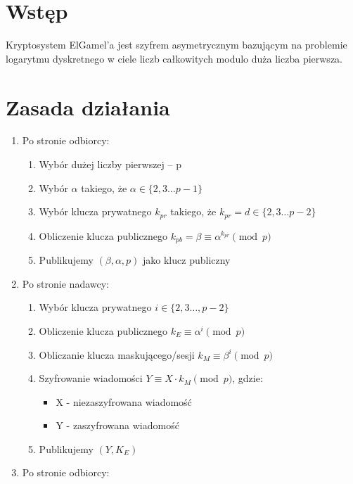 \documentclass{article}
\begin{document}
    \section{Wstęp}
    Kryptosystem ElGamel'a jest szyfrem asymetrycznym bazującym na problemie logarytmu dyskretnego w ciele liczb całkowitych modulo duża liczba pierwsza.

    \section{Zasada działania}

    \begin{enumerate}
        \item Po stronie odbiorcy:
        \begin{enumerate}
            \item Wybór dużej liczby pierwszej -- p
            \item Wybór $\alpha$ takiego, że $ \alpha \in \{ 2,3 \dots p-1 \} $
            \item Wybór klucza prywatnego $k_{pr}$ takiego, że $ k_{pr}=d \in \{2,3 \dots p-2 \} $
            \item Obliczenie klucza publicznego $k_{pb} = \beta \equiv \alpha ^ {k_{pr}} \pmod p$
            \item Publikujemy $(\beta , \alpha ,p)$ jako klucz publiczny
        \end{enumerate}
        \item  Po stronie nadawcy:
        \begin{enumerate}
            \item Wybór klucza prywatnego $i \in \{2,3 \dots ,p-2\}$
            \item Obliczenie klucza publicznego $k_E \equiv \alpha ^ {i} \pmod p$
            \item Obliczanie klucza maskującego/sesji $k_M \equiv \beta ^i \pmod p$
            \item Szyfrowanie wiadomości $Y \equiv X \cdot k_M \pmod p$, gdzie:
            \begin{itemize}
                \item X - niezaszyfrowana wiadomość
                \item Y - zaszyfrowana wiadomość
            \end{itemize}
            \item Publikujemy $(Y,K_E)$
        \end{enumerate}
        \item Po stronie odbiorcy:

\end{enumerate}
\end{document}
